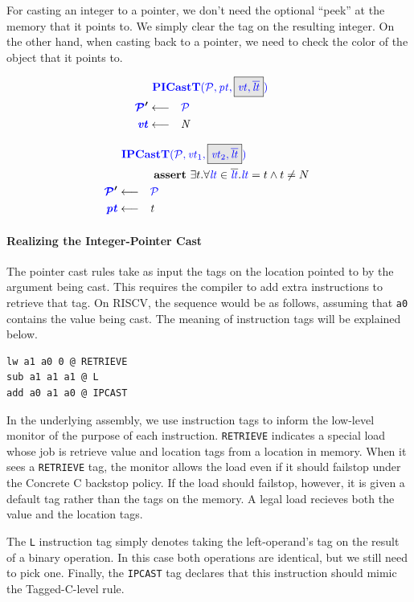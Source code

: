 \documentclass[acmsmall,review,anonymous]{acmart}\settopmatter{printfolios=true,printccs=false,printacmref=false}
\begin{document}
For casting an integer to a pointer, we don't need the optional ``peek'' at the memory that it points to.
We simply clear the tag on the resulting integer. On the other hand, when casting back to a pointer,
we need to check the color of the object that it points to.

\begin{minipage}{0.34\textwidth}
\[\begin{aligned}
\truledef{\picastt}
\settag{\PCT'}{\PCT}
\settag{\vt}{N}
\end{aligned}\]
\end{minipage}
\begin{minipage}{0.65\textwidth}
\[\begin{aligned}
\truledef{\ipcastt}
\assert{\exists t . \forall \lt \in \overline{\lt} . \lt = t \land t \not = N}
\settag{\PCT'}{\PCT}
\settag{\pt}{t}
\end{aligned}\]
\end{minipage}

\paragraph{Realizing the Integer-Pointer Cast}

The pointer cast rules take as input the tags on the location pointed to by the
argument being cast. This requires the compiler to add extra instructions to retrieve that tag.
On RISCV, the sequence would be as follows, assuming that {\tt a0} contains the
value being cast. The meaning of instruction tags will be explained below.

\begin{verbatim}
lw a1 a0 0 @ RETRIEVE
sub a1 a1 a1 @ L
add a0 a1 a0 @ IPCAST
\end{verbatim}

In the underlying assembly, we use instruction tags to inform the low-level monitor
of the purpose of each instruction. {\tt RETRIEVE} indicates a special load
whose job is retrieve value and location tags from a location in memory. When it sees
a {\tt RETRIEVE} tag, the monitor allows the load even if it should failstop under the
Concrete C backstop policy. If the load should failstop, however, it is given a default
tag rather than the tags on the memory. A legal load recieves both the value and the location
tags.

The {\tt L} instruction tag simply denotes taking the left-operand's tag on the result of a
binary operation. In this case both operations are identical, but we still need to pick one.
Finally, the {\tt IPCAST} tag declares that this instruction should mimic the Tagged-C-level
rule.
\end{document}
